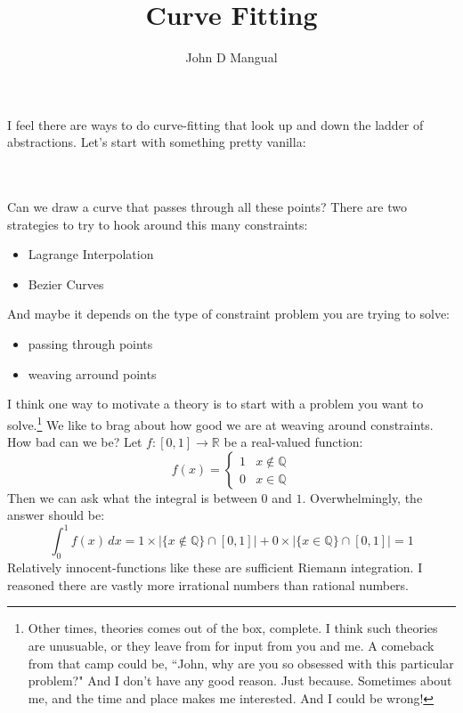 \documentclass[12pt]{article}
\title{Curve Fitting}
\author{John D Mangual}
\date{}
\begin{document}
\selectfont \fontsize{12.5}{15}\selectfont

\maketitle

\noindent I feel there are ways to do curve-fitting that look up and down the ladder of abstractions.  Let's start with something pretty vanilla: \\ \\
 \\ 
Can we draw a curve that passes through all these points?  There are two strategies to try to hook around this many constraints:
\begin{itemize}
\item Lagrange Interpolation
\item Bezier Curves
\end{itemize} 
And maybe it depends on the type of constraint problem you are trying to solve: 
\begin{itemize}
\item passing through points
\item weaving arround points
\end{itemize}
I think one way to motivate a theory is to start with a problem you want to solve.\footnote{Other times, theories comes out of the box, complete. I think such theories are unusuable, or they leave from for input from you and me.  A comeback from that camp could be, ``John, why are you so obsessed with this particular problem?"  And I don't have any good reason.  Just because.  Sometimes about me, and the time and place makes me interested.  And I could be wrong!} We like to brag about how good we are at weaving around constraints.  How bad can we be?  Let $f: [0,1] \to \mathbb{R}$ be a real-valued function:
$$ f(x) = \left\{  \begin{array}{cc} 1 & x \notin \mathbb{Q}  \\ 
0 & x \in \mathbb{Q} \end{array} \right. $$
Then we can ask what the integral is between $0$ and $1$.  Overwhelmingly, the answer should be:
$$ \int_0^1 f(x) \, dx = 1 \times \Big|\{ x \notin \mathbb{Q}  \}\cap [0,1]\Big| + 0 \times \Big|\{ x \in \mathbb{Q}  \}\cap [0,1]\Big| =  1 $$
Relatively innocent-functions like these are sufficient Riemann integration.  I reasoned there are vastly more irrational numbers than rational numbers.
\end{document}
